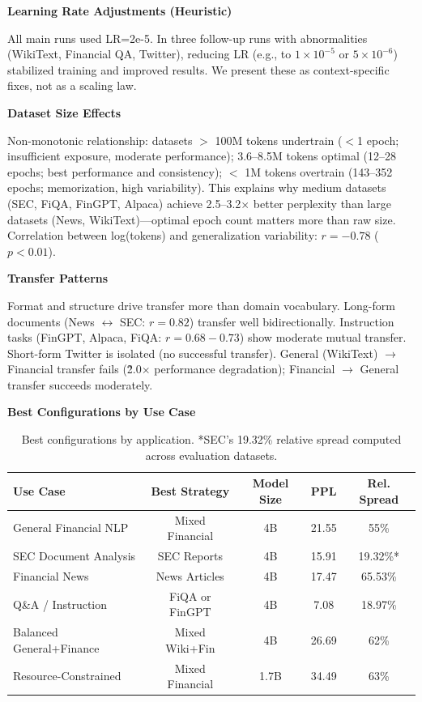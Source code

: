 \textbf{Learning Rate Adjustments (Heuristic)}

All main runs used LR=2e-5. In three follow-up runs with abnormalities (WikiText, Financial QA, Twitter), reducing LR (e.g., to $1\times10^{-5}$ or $5\times10^{-6}$) stabilized training and improved results. We present these as context-specific fixes, not as a scaling law.

\textbf{Dataset Size Effects}

Non-monotonic relationship: datasets $>$ 100M tokens undertrain ($<$1 epoch; insufficient exposure, moderate performance); 3.6–8.5M tokens optimal (12–28 epochs; best performance and consistency); $<$ 1M tokens overtrain (143–352 epochs; memorization, high variability). This explains why medium datasets (SEC, FiQA, FinGPT, Alpaca) achieve 2.5–3.2$\times$ better perplexity than large datasets (News, WikiText)—optimal epoch count matters more than raw size. Correlation between log(tokens) and generalization variability: $r = -0.78$ ($p < 0.01$).

\textbf{Transfer Patterns}

Format and structure drive transfer more than domain vocabulary. Long-form documents (News $\leftrightarrow$ SEC: $r = 0.82$) transfer well bidirectionally. Instruction tasks (FinGPT, Alpaca, FiQA: $r = 0.68-0.73$) show moderate mutual transfer. Short-form Twitter is isolated (no successful transfer). General (WikiText) $\to$ Financial transfer fails (\~2.0$\times$ performance degradation); Financial $\to$ General transfer succeeds moderately.

\textbf{Best Configurations by Use Case}

\begin{table}[htbp]
\centering
\small
\begin{tabular}{lcccc}
\toprule
\textbf{Use Case} & \textbf{Best Strategy} & \textbf{Model Size} & \textbf{PPL} & \textbf{Rel. Spread} \\
\midrule
General Financial NLP & Mixed Financial & 4B & 21.55 & 55\% \\
SEC Document Analysis & SEC Reports & 4B & 15.91 & 19.32\%* \\
Financial News & News Articles & 4B & 17.47 & 65.53\% \\
Q\&A / Instruction & FiQA or FinGPT & 4B & 7.08 & 18.97\% \\
Balanced General+Finance & Mixed Wiki+Fin & 4B & 26.69 & 62\% \\
Resource-Constrained & Mixed Financial & 1.7B & 34.49 & 63\% \\
\bottomrule
\end{tabular}
\caption[Best Configurations by Application]{Best configurations by application. *SEC's 19.32\% relative spread computed across evaluation datasets.}
\end{table}


